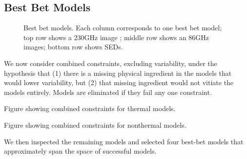 
\subsection{Best Bet Models}

\begin{figure}
    \centering
    \caption{Best bet models.  Each column corresponds to one best bet model; top row shows a 230GHz image ; middle row shows an 86GHz images; bottom row shows SEDs.}
    \label{fig:my_label}
\end{figure}


We now consider combined constraints, excluding variability, under the hypothesis that (1) there is a missing physical ingredient in the models that would lower variability, but (2) that missing ingredient would not vitiate the models entirely.  Models are eliminated if they fail any one constraint.

Figure showing combined constraints for thermal models.

Figure showing combined constraints for nonthermal models.

We then inspected the remaining models and selected four best-bet models that approximately span the space of successful models.  
